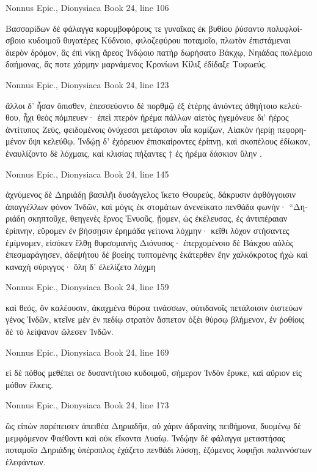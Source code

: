 \documentclass[12pt,letterpaper,twoside,final]{memoir}
\begin{document}
\begin{greek}
Nonnus Epic., Dionysiaca 
Book 24, line 106

Βασσαρίδων δὲ φάλαγγα κορυμβοφόρους τε γυναῖκας 
ἐκ βυθίου ῥύσαντο πολυφλοίσβοιο κυδοιμοῦ 
θυγατέρες Κύδνοιο, φιλοζεφύρου ποταμοῖο, 
πλωτὸν ἐπιστάμεναι διερὸν δρόμον, ἃς ἐπὶ νίκῃ 
ἄρεος Ἰνδῴοιο πατὴρ δωρήσατο Βάκχῳ, 
Νηιάδας πολέμοιο δαήμονας, ἅς ποτε χάρμην 
μαρνάμενος Κρονίωνι Κίλιξ ἐδίδαξε Τυφωεύς. 



Nonnus Epic., Dionysiaca 
Book 24, line 123

ἄλλοι δ' ἦσαν ὄπισθεν, ἐπεσσεύοντο δὲ πορθμῷ 
ἐξ ἑτέρης ἀνιόντες ἀθηήτοιο κελεύθου, 
ἧχι θεὸς πόμπευεν· ἐπεὶ πτερὸν ἠρέμα πάλλων 
αἰετὸς ἡγεμόνευε δι' ἠέρος ἀντίτυπος Ζεύς, 
φειδομένοις ὀνύχεσσι μετάρσιον υἷα κομίζων, 
Αἰακὸν ἠερίῃ πεφορημένον ὕψι κελεύθῳ. 
 Ἰνδῴῃ δ' ἐχόρευον ἐπισκαίροντες ἐρίπνῃ, 
καὶ σκοπέλους ἐδίωκον, ἐναυλίζοντο δὲ λόχμαις, 
καὶ κλισίας πήξαντες † ἐς ἠρέμα δάσκιον ὕλην . 



Nonnus Epic., Dionysiaca 
Book 24, line 145

                                          ἀχνύμενος δὲ 
Δηριάδῃ βασιλῆι δυσάγγελος ἵκετο Θουρεύς, 
δάκρυσιν ἀφθόγγοισιν ἀπαγγέλλων φόνον Ἰνδῶν, 
καὶ μόγις ἐκ στομάτων ἀνενείκατο πενθάδα φωνήν· 
 “Δηριάδη σκηπτοῦχε, θεηγενὲς ἔρνος Ἐνυοῦς, 
ᾔομεν, ὡς ἐκέλευσας, ἐς ἀντιπέραιαν ἐρίπνην, 
εὕρομεν ἐν βήσσῃσιν ἐρημάδα γείτονα λόχμην· 
κεῖθι λόχον στήσαντες ἐμίμνομεν, εἰσόκεν ἔλθῃ 
θυρσομανὴς Διόνυσος· ἐπερχομένοιο δὲ Βάκχου 
αὐλὸς ἐπεσμαράγησεν, ἀδεψήτου δὲ βοείης   
τυπτομένης ἑκάτερθεν ἔην χαλκόκροτος ἠχὼ 
καὶ καναχὴ σύριγγος· ὅλη δ' ἐλελίζετο λόχμη 




Nonnus Epic., Dionysiaca 
Book 24, line 159

καὶ θεός, ὃν καλέουσιν, ἀκαχμένα θύρσα τινάσσων, 
οὐτιδανοῖς πετάλοισιν ὀιστεύων γένος Ἰνδῶν, 
κτεῖνε μὲν ἐν πεδίῳ στρατὸν ἄσπετον ὀξέι θύρσῳ 
βλήμενον, ἐν ῥοθίοις δὲ τὸ λείψανον ὤλεσεν Ἰνδῶν. 



Nonnus Epic., Dionysiaca 
Book 24, line 169

εἰ δὲ πόθος μεθέπει σε δυσαντήτοιο κυδοιμοῦ, 
σήμερον Ἰνδὸν ἔρυκε, καὶ αὔριον εἰς μόθον ἕλκεις. 



Nonnus Epic., Dionysiaca 
Book 24, line 173

ὣς εἰπὼν παρέπεισεν ἀπειθέα Δηριαδῆα, 
οὐ χάριν ἀδρανίης πειθήμονα, δυομένῳ δὲ 
μεμφόμενον Φαέθοντι καὶ οὐκ εἴκοντα Λυαίῳ. 
Ἰνδῴην δὲ φάλαγγα μεταστήσας ποταμοῖο 
Δηριάδης ὑπέροπλος ἐχάζετο πενθάδι λύσσῃ, 
ἑζόμενος λοφιῇσι παλιννόστων ἐλεφάντων. 




\end{greek}
\end{document}
